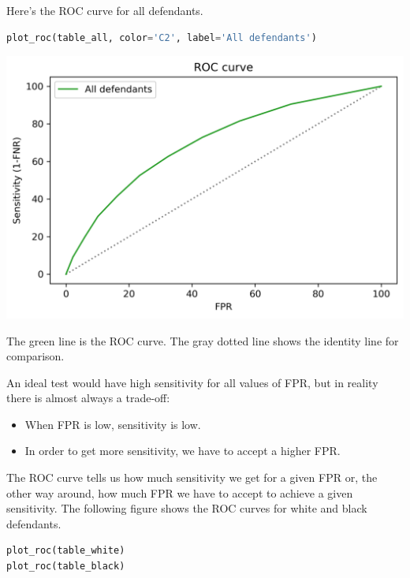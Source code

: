 Here's the ROC curve for all defendants.

\begin{lstlisting}[language=Python,style=source]
plot_roc(table_all, color='C2', label='All defendants')
\end{lstlisting}

\begin{center}
\includegraphics[scale=0.75]{02_calibration_files/02_calibration_64_0.png}
\end{center}

The green line is the ROC curve. The gray dotted line shows the identity
line for comparison.

An ideal test would have high sensitivity for all values of FPR, but in
reality there is almost always a trade-off:

\begin{itemize}
\item
  When FPR is low, sensitivity is low.
\item
  In order to get more sensitivity, we have to accept a higher FPR.
\end{itemize}

The ROC curve tells us how much sensitivity we get for a given FPR or,
the other way around, how much FPR we have to accept to achieve a given
sensitivity. The following figure shows the ROC curves for white and
black defendants.

\begin{lstlisting}[language=Python,style=source]
plot_roc(table_white)
plot_roc(table_black)
\end{lstlisting}

